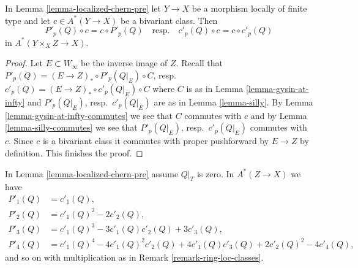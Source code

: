 \begin{lemma}
\label{lemma-homomorphism-commute}
In Lemma \ref{lemma-localized-chern-pre} let $Y \to X$ be a morphism
locally of finite type and let $c \in A^*(Y \to X)$ be a bivariant class.
Then
$$
P'_p(Q) \circ c = c \circ P'_p(Q)
\quad\text{resp.}\quad
c'_p(Q) \circ c = c \circ c'_p(Q)
$$
in $A^*(Y \times_X Z \to X)$.
\end{lemma}

\begin{proof}
Let $E \subset W_\infty$ be the inverse image of $Z$.
Recall that $P'_p(Q) = (E \to Z)_* \circ P'_p(Q|_E) \circ C$,
resp.\ $c'_p(Q) = (E \to Z)_* \circ c'_p(Q|_E) \circ C$
where $C$ is as in Lemma \ref{lemma-gysin-at-infty} and
$P'_p(Q|_E)$, resp.\ $c'_p(Q|_E)$ are as in
Lemma \ref{lemma-silly}.
By Lemma \ref{lemma-gysin-at-infty-commutes}
we see that $C$ commutes with $c$
and by Lemma \ref{lemma-silly-commutes} we see that
$P'_p(Q|_E)$, resp.\ $c'_p(Q|_E)$ commutes with $c$.
Since $c$ is a bivariant class it commutes with proper
pushforward by $E \to Z$ by definition. This finishes the proof.
\end{proof}

\begin{lemma}
\label{lemma-localized-chern-pre-compose}
In Lemma \ref{lemma-localized-chern-pre} assume $Q|_T$ is zero. In
$A^*(Z \to X)$ we have
\begin{align*}
P'_1(Q) & = c'_1(Q), \\
P'_2(Q) & = c'_1(Q)^2 - 2c'_2(Q), \\
P'_3(Q) & = c'_1(Q)^3 - 3c'_1(Q)c'_2(Q) + 3c'_3(Q), \\
P'_4(Q) & = c'_1(Q)^4 - 4c'_1(Q)^2c'_2(Q) +
4c'_1(Q)c'_3(Q) + 2c'_2(Q)^2 - 4c'_4(Q),
\end{align*}
and so on with multiplication as in Remark \ref{remark-ring-loc-classes}.
\end{lemma}

